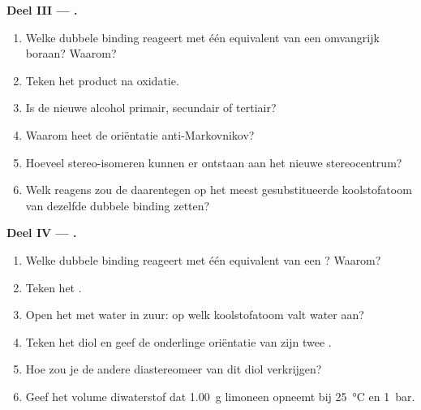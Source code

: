 \begin{problem}
\medskip
\noindent\textbf{Deel III --- .}
\begin{enumerate}[resume]
  \item Welke dubbele binding reageert met één equivalent van een omvangrijk boraan? Waarom?
  \item Teken het product na oxidatie.
  \item Is de nieuwe alcohol primair, secundair of tertiair?
  \item Waarom heet de oriëntatie anti-Markovnikov?
  \item Hoeveel stereo-isomeren kunnen er ontstaan aan het nieuwe stereocentrum?
  \item Welk reagens zou de  daarentegen op het meest gesubstitueerde koolstofatoom van
        dezelfde dubbele binding zetten?
\end{enumerate}

\medskip
\noindent\textbf{Deel IV --- .}
\begin{enumerate}[resume]
  \item Welke dubbele binding reageert met één equivalent van een ? Waarom?
  \item Teken het .
  \item Open het met water in zuur: op welk koolstofatoom valt water aan?
  \item Teken het diol en geef de onderlinge oriëntatie van zijn twee .
  \item Hoe zou je de andere diastereomeer van dit diol verkrijgen?
  \item Geef het volume diwaterstof dat \qty{1.00}{g} limoneen opneemt bij
        \qty{25}{\degreeCelsius} en \qty{1}{bar}.
\end{enumerate}
\end{problem}
